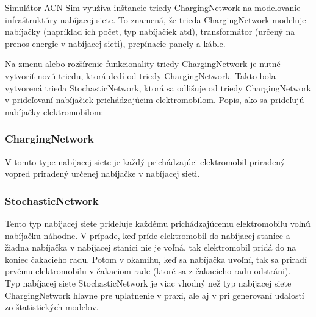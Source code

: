 Simulátor ACN-Sim využíva inštancie triedy ChargingNetwork na modelovanie infraštruktúry nabíjacej siete. To znamená, že trieda ChargingNetwork modeluje nabíjačky (napríklad ich počet, typ nabíjačiek atď), transformátor (určený na prenos energie v nabíjacej sieti), prepínacie panely a káble. 

Na zmenu alebo rozšírenie funkcionality triedy ChargingNetwork je nutné vytvoriť novú triedu, ktorá dedí od triedy ChargingNetwork. Takto bola vytvorená trieda StochasticNetwork, ktorá sa odlišuje od triedy ChargingNetwork v prideľovaní nabíjačiek prichádzajúcim elektromobilom. Popis, ako sa prideľujú nabíjačky elektromobilom:


\subsubsection*{ChargingNetwork} V tomto type nabíjacej siete je každý prichádzajúci elektromobil priradený vopred priradený určenej nabíjačke v nabíjacej sieti. 

\subsubsection*{StochasticNetwork} Tento typ nabíjacej siete prideľuje každému prichádzajúcemu elektromobilu voľnú nabíjačku náhodne. V prípade, keď príde elektromobil do nabíjacej stanice a žiadna nabíjačka v nabíjacej stanici nie je voľná, tak elektromobil pridá do na koniec čakacieho radu. Potom v okamihu, keď sa nabíjačka uvoľní, tak sa priradí prvému elektromobilu v čakaciom rade (ktoré sa z čakacieho radu odstráni).   \\



%


Typ nabíjacej siete StochasticNetwork je viac vhodný než typ nabijacej siete ChargingNetwork hlavne pre uplatnenie v praxi, ale aj v pri generovaní udalostí zo štatistických modelov. \cite{lee2021acnsim}

